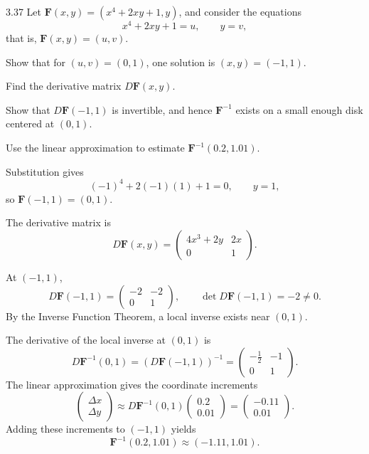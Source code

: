 \documentclass[11pt,oneside]{article}
\begin{document}
\begin{problem}{3.37}
Let $\mathbf F(x,y)=(x^4+2xy+1,y)$, and consider the equations
\[
    x^4+2xy+1=u,
    \qquad
    y=v,
\]
that is, $\mathbf F(x,y)=(u,v)$.
\begin{problemsubparts}
    \item Show that for $(u,v)=(0,1)$, one solution is $(x,y)=(-1,1)$.
    \item Find the derivative matrix $D\mathbf F(x,y)$.
    \item Show that $D\mathbf F(-1,1)$ is invertible, and hence $\mathbf F^{-1}$ exists on a small enough disk centered at $(0,1)$.
    \item Use the linear approximation to estimate $\mathbf F^{-1}(0.2,1.01)$.
\end{problemsubparts}
\end{problem}

\begin{solution}
\begin{problemsubparts}
    \item Substitution gives
    \[
        (-1)^4+2(-1)(1)+1=0,
        \qquad
        y=1,
    \]
    so $\boxed{\mathbf F(-1,1)=(0,1)}$.

    \item The derivative matrix is
    \[
        \boxed{D\mathbf F(x,y)=
        \begin{pmatrix}
            4x^3+2y & 2x\\
            0 & 1
        \end{pmatrix}}.
    \]

    \item At $(-1,1)$,
    \[
        D\mathbf F(-1,1)=
        \begin{pmatrix}-2&-2\\0&1\end{pmatrix},
        \qquad
        \det D\mathbf F(-1,1)=-2\neq0.
    \]
    By the Inverse Function Theorem, a local inverse exists near $(0,1)$.

    \item The derivative of the local inverse at $(0,1)$ is
    \[
        D\mathbf F^{-1}(0,1)
        =(D\mathbf F(-1,1))^{-1}
        =\begin{pmatrix}-\frac12&-1\\0&1\end{pmatrix}.
    \]
    The linear approximation gives the coordinate increments
    \[
        \begin{pmatrix}\Delta x\\\Delta y\end{pmatrix}
        \approx D\mathbf F^{-1}(0,1)
        \begin{pmatrix}0.2\\0.01\end{pmatrix}
        =\begin{pmatrix}-0.11\\0.01\end{pmatrix}.
    \]
    Adding these increments to $(-1,1)$ yields
    \[
        \boxed{\mathbf F^{-1}(0.2,1.01)\approx(-1.11,1.01)}.
    \]
\end{problemsubparts}
\end{solution}
\end{document}
